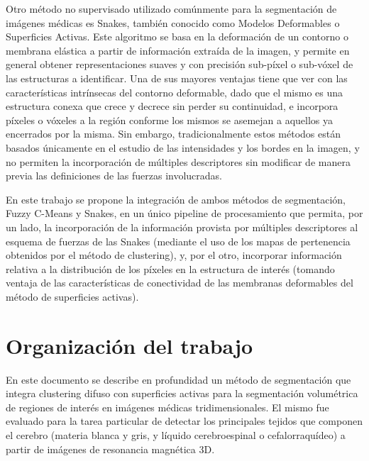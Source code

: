 Otro método no supervisado utilizado comúnmente para la segmentación de imágenes médicas es Snakes, también conocido como Modelos Deformables o Superficies Activas. Este algoritmo se basa en la deformación de un contorno o membrana elástica a partir de información extraída de la imagen, y permite en general obtener representaciones suaves y con precisión sub-píxel o sub-vóxel de las estructuras a identificar. Una de sus mayores ventajas tiene que ver con las características intrínsecas del contorno deformable, dado que el mismo es una estructura conexa que crece y decrece sin perder su continuidad, e incorpora píxeles o vóxeles a la región conforme los mismos se asemejan a aquellos ya encerrados por la misma. Sin embargo, tradicionalmente estos métodos están basados únicamente en el estudio de las intensidades y los bordes en la imagen, y no permiten la incorporación de múltiples descriptores sin modificar de manera previa las definiciones de las fuerzas involucradas.

En este trabajo se propone la integración de ambos métodos de segmentación, Fuzzy C-Means y Snakes, en un único pipeline de procesamiento que permita, por un lado, la incorporación de la información provista por múltiples descriptores al esquema de fuerzas de las Snakes (mediante el uso de los mapas de pertenencia obtenidos por el método de clustering), y, por el otro, incorporar información relativa a la distribución de los píxeles en la estructura de interés (tomando ventaja de las características de conectividad de las membranas deformables del método de superficies activas).
\section{Organización del trabajo}
En este documento se describe en profundidad un método de segmentación que integra clustering difuso con superficies activas para la segmentación volumétrica de regiones de interés en imágenes médicas tridimensionales. El mismo fue evaluado para la tarea particular de detectar los principales tejidos que componen el cerebro (materia blanca y gris, y líquido cerebroespinal o cefalorraquídeo) a partir de imágenes de resonancia magnética 3D.

